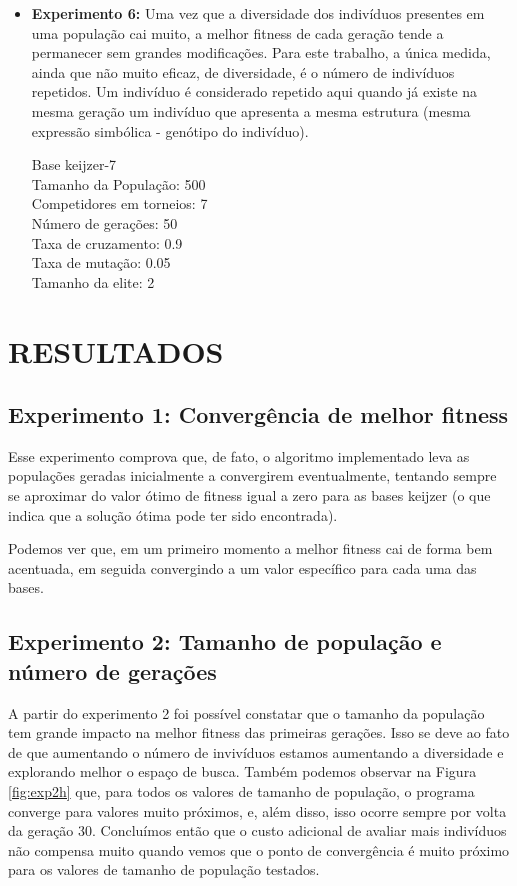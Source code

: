 \documentclass[12pt]{article}
\begin{document}
\begin{itemize}
 \item \textbf{Experimento 6:} Uma vez que a diversidade dos indivíduos presentes em uma população
 cai muito, a melhor fitness de cada geração tende a permanecer sem grandes modificações. Para este
 trabalho, a única medida, ainda que não muito eficaz, de diversidade, é o número de indivíduos
 repetidos. Um indivíduo é considerado repetido aqui quando já existe na mesma geração um indivíduo
 que apresenta a mesma estrutura (mesma expressão simbólica - genótipo do indivíduo).
 
 Base keijzer-7 \\
 Tamanho da População: 500 \\
 Competidores em torneios: 7 \\
 Número de gerações: 50 \\
 Taxa de cruzamento: 0.9 \\ 
 Taxa de mutação: 0.05 \\
 Tamanho da elite: 2 \\
 
\end{itemize}


\section{RESULTADOS} \label{sec:result}

\subsection{Experimento 1: Convergência de melhor fitness}

Esse experimento comprova que, de fato, o algoritmo implementado leva as populações
geradas inicialmente a convergirem eventualmente, tentando sempre se aproximar do valor
ótimo de fitness igual a zero para as bases keijzer (o que indica que a solução ótima
pode ter sido encontrada).
  
Podemos ver que, em um primeiro momento a melhor fitness cai de forma bem acentuada,
em seguida convergindo a um valor específico para cada uma das bases.

\subsection{Experimento 2: Tamanho de população e número de gerações}

A partir do experimento 2 foi possível constatar que o tamanho da população tem grande impacto
na melhor fitness das primeiras gerações. Isso se deve ao fato de que aumentando o número de
invivíduos estamos aumentando a diversidade e explorando melhor o espaço de busca. Também
podemos observar na Figura \ref{fig:exp2h} que, para todos os valores de tamanho de população,
o programa converge para valores muito próximos, e, além disso, isso ocorre sempre por volta da 
geração 30. Concluímos então que o custo adicional de avaliar mais indivíduos não compensa muito
quando vemos que o ponto de convergência é muito próximo para os valores de tamanho de população
testados.
\end{document}
